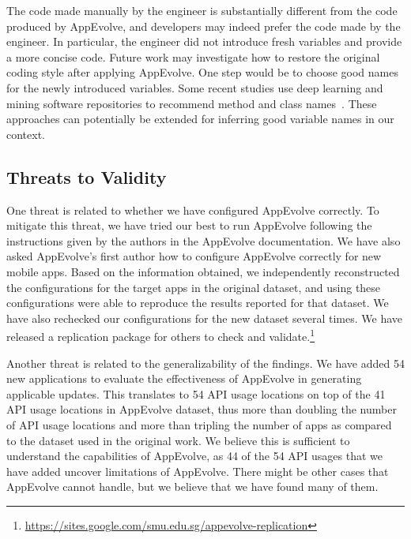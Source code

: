 
\vspace{0.5cm}The code made manually by the engineer is substantially
different from the code produced by AppEvolve, and developers may indeed
prefer the code made by the engineer. In particular, the engineer did not
introduce fresh variables and provide a more concise code.  Future work may investigate how to
restore the original coding style after applying AppEvolve. One step would
be to choose good names for the newly introduced variables. Some recent
studies use deep learning and mining software repositories to recommend
method and class names~\cite{allamanis2015suggesting}. These approaches can
potentially be extended for inferring good variable names in our context.

\subsection{Threats to Validity}

One threat is related to whether we have configured AppEvolve correctly. To
mitigate this threat, we have tried our best to run AppEvolve following the
instructions given by the authors in the AppEvolve documentation. We have
also asked AppEvolve's first author how to configure AppEvolve correctly
for new mobile apps. Based on the information obtained, we independently
reconstructed the configurations for the target apps in the original
dataset, and using these configurations were able to reproduce the results
reported for that dataset.  We have also rechecked our configurations for
the new dataset several times. We have released a replication package for
others to check and
validate.\footnote{\url{https://sites.google.com/smu.edu.sg/appevolve-replication}}

Another threat is related to the generalizability of the findings. We have added 54 new applications to evaluate the effectiveness of
AppEvolve in generating applicable updates. This translates to 54 API usage
locations on top of the 41 API usage locations in AppEvolve dataset, thus
more than doubling the number of API usage locations and more than tripling the number of apps as compared to the dataset used in the original work. We
believe this is sufficient to understand the capabilities of AppEvolve, as
44 of the 54 API usages that we have added uncover limitations of
AppEvolve. There might be other cases that AppEvolve cannot handle, but we
believe that we have found many of them.

